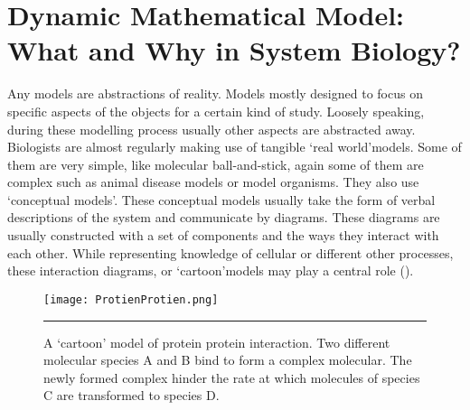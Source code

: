 \section{Dynamic Mathematical Model: What and Why in System Biology?}
Any models are abstractions of reality. Models mostly designed to focus on specific aspects of the objects for a certain kind of study. Loosely speaking, during these modelling process usually other aspects are abstracted away. Biologists are almost regularly making use of tangible \lq real world\rq  models. Some of them are very simple, like molecular ball-and-stick, again some of them are complex such as animal disease models or model organisms. They also use \lq conceptual models\rq. These conceptual models usually take the form of verbal descriptions of the system and communicate by diagrams. These diagrams are usually constructed with a set of components and the ways they interact with each other. While representing knowledge of cellular or different other processes, these interaction diagrams, or \lq cartoon\rq models may play a central role (\cite{Ingalls:2012}).

\begin{figure}%
	\centering
		\texttt{[image: ProtienProtien.png]}
		\rule{35em}{0.5pt}
	\caption[A ‘cartoon’ model of protein protein interaction.]{A ‘cartoon’ model of protein protein interaction. Two different molecular species A and B bind to form a complex molecular. The newly formed complex hinder the rate at which molecules of species C are transformed to species D.}
	\label{fig:Protein protein interaction}
\end{figure}

